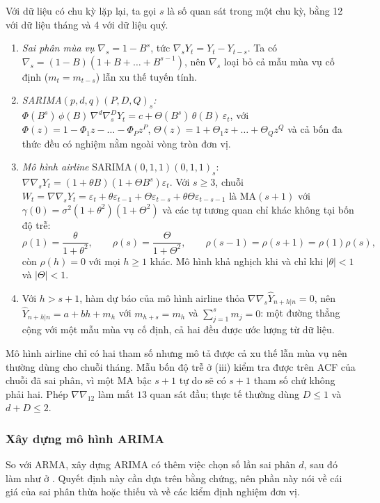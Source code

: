 Với dữ liệu có chu kỳ lặp lại, ta gọi $s$ là số quan sát trong một chu kỳ, bằng 12 với dữ liệu tháng và 4 với dữ liệu quý.
\begin{kq}
\begin{enumerate}[label=(\roman*),leftmargin=*,itemsep=1pt]
\item \emph{Sai phân mùa vụ} $\nabla_s=1-B^s$, tức $\nabla_sY_t=Y_t-Y_{t-s}$. Ta có $\nabla_s=(1-B)(1+B+\dots+B^{s-1})$, nên $\nabla_s$ loại bỏ cả mẫu mùa vụ cố định ($m_t=m_{t-s}$) lẫn xu thế tuyến tính.
\item \emph{SARIMA$(p,d,q)(P,D,Q)_s$:} $\Phi(B^s)\,\phi(B)\,\nabla^d\nabla_s^DY_t=c+\Theta(B^s)\,\theta(B)\,\varepsilon_t$, với $\Phi(z)=1-\Phi_1z-\dots-\Phi_Pz^P$, $\Theta(z)=1+\Theta_1z+\dots+\Theta_Qz^Q$ và cả bốn đa thức đều có nghiệm nằm ngoài vòng tròn đơn vị.
\item \emph{Mô hình airline} SARIMA$(0,1,1)(0,1,1)_s$: $\nabla\nabla_sY_t=(1+\theta B)(1+\Theta B^s)\varepsilon_t$. Với $s\ge3$, chuỗi $W_t=\nabla\nabla_sY_t=\varepsilon_t+\theta\varepsilon_{t-1}+\Theta\varepsilon_{t-s}+\theta\Theta\varepsilon_{t-s-1}$ là MA$(s+1)$ với $\gamma(0)=\sigma^2(1+\theta^2)(1+\Theta^2)$ và các tự tương quan chỉ khác không tại bốn độ trễ:
\[
\rho(1)=\frac{\theta}{1+\theta^2},\qquad \rho(s)=\frac{\Theta}{1+\Theta^2},\qquad \rho(s-1)=\rho(s+1)=\rho(1)\rho(s),
\]
còn $\rho(h)=0$ với mọi $h\ge1$ khác. Mô hình khả nghịch khi và chỉ khi $|\theta|<1$ và $|\Theta|<1$.
\item Với $h>s+1$, hàm dự báo của mô hình airline thỏa $\nabla\nabla_s\hat Y_{n+h|n}=0$, nên $\hat Y_{n+h|n}=a+bh+m_h$ với $m_{h+s}=m_h$ và $\sum_{j=1}^{s}m_j=0$: một đường thẳng cộng với một mẫu mùa vụ cố định, cả hai đều được ước lượng từ dữ liệu.
\end{enumerate}
\end{kq}
Mô hình airline chỉ có hai tham số nhưng mô tả được cả xu thế lẫn mùa vụ nên thường dùng cho chuỗi tháng. Mẫu bốn độ trễ ở (iii) kiểm tra được trên ACF của chuỗi đã sai phân, vì một MA bậc $s+1$ tự do sẽ có $s+1$ tham số chứ không phải hai. Phép $\nabla\nabla_{12}$ làm mất $13$ quan sát đầu; thực tế thường dùng $D\le1$ và $d+D\le2$.

\subsubsection{Xây dựng mô hình ARIMA}

So với ARMA, xây dựng ARIMA có thêm việc chọn số lần sai phân $d$, sau đó làm như ở . Quyết định này cần dựa trên bằng chứng, nên phần này nói về cái giá của sai phân thừa hoặc thiếu và về các kiểm định nghiệm đơn vị.


